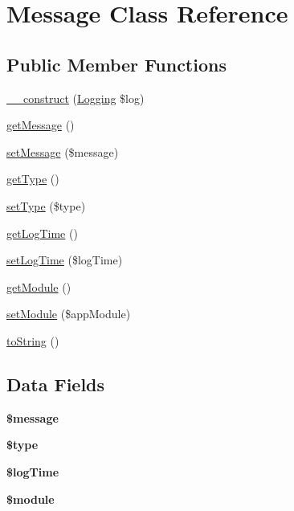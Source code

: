 \hypertarget{class_message}{\section{Message Class Reference}
\label{class_message}
}
\subsection*{Public Member Functions}
\begin{DoxyCompactItemize}
\item 
\hyperlink{class_message_a58294f8d064313ca6f7da911ba058480}{\+\_\+\+\_\+construct} (\hyperlink{class_logging}{Logging} \$log)
\item 
\hyperlink{class_message_a0b0e611236742aac18ba1936d03ba89a}{get\+Message} ()
\item 
\hyperlink{class_message_a6991eb53548e7180a3a8e6f418fbb234}{set\+Message} (\$message)
\item 
\hyperlink{class_message_a830b5c75df72b32396701bc563fbe3c7}{get\+Type} ()
\item 
\hyperlink{class_message_ade096bf521b5d05dcaff2ba1a42e9f71}{set\+Type} (\$type)
\item 
\hyperlink{class_message_ad153d4294dd57ed74888d7d46ff13883}{get\+Log\+Time} ()
\item 
\hyperlink{class_message_ab07eb8a8a7fbd601dc02837aa5f64762}{set\+Log\+Time} (\$log\+Time)
\item 
\hyperlink{class_message_a47c6387b9047dec02c1ece587d3c2b32}{get\+Module} ()
\item 
\hyperlink{class_message_a521006b77fa0cc8ffdd11459b0a24421}{set\+Module} (\$app\+Module)
\item 
\hyperlink{class_message_a5558c5d549f41597377fa1ea8a1cefa3}{to\+String} ()
\end{DoxyCompactItemize}
\subsection*{Data Fields}
\begin{DoxyCompactItemize}
\item 
\hypertarget{class_message_abf17cb2dba2ed17cb28aa5f37deb5293}{{\bfseries \$message}}\label{class_message_abf17cb2dba2ed17cb28aa5f37deb5293}

\item 
\hypertarget{class_message_a9a4a6fba2208984cabb3afacadf33919}{{\bfseries \$type}}\label{class_message_a9a4a6fba2208984cabb3afacadf33919}

\item 
\hypertarget{class_message_ad5773113df1bf6a20d8bbf7804da5a4d}{{\bfseries \$log\+Time}}\label{class_message_ad5773113df1bf6a20d8bbf7804da5a4d}

\item 
\hypertarget{class_message_ac531301c55a8d8b6c7613597218ff482}{{\bfseries \$module}}\label{class_message_ac531301c55a8d8b6c7613597218ff482}

\end{DoxyCompactItemize}


